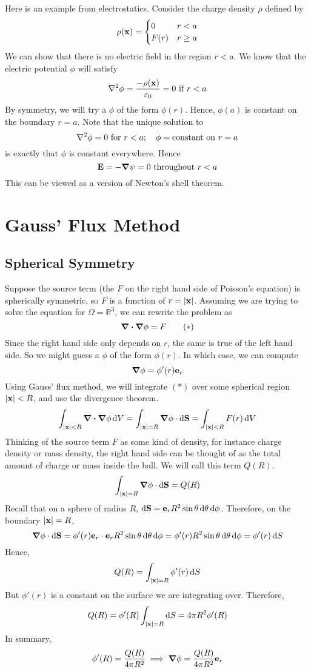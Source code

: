 \documentclass{article}
\begin{document}
\noindent Here is an example from electrostatics. Consider the charge density $\rho$ defined by
\[ \rho(\vb x) = \begin{cases}
        0    & r < a    \\
        F(r) & r \geq a
    \end{cases} \]
We can show that there is no electric field in the region $r < a$. We know that the electric potential $\phi$ will satisfy
\[ \laplacian{\phi} = \frac{-\rho(\vb x)}{\varepsilon_0} = 0 \text{ if } r<a \]
By symmetry, we will try a $\phi$ of the form $\phi(r)$. Hence, $\phi(a)$ is constant on the boundary $r=a$. Note that the unique solution to
\[ \laplacian{\phi} = 0 \text{ for } r<a;\quad \phi = \text{constant on } r = a \]
is exactly that $\phi$ is constant everywhere. Hence
\[ \vb E = -\grad{\psi} = 0 \text{ throughout } r<a \]
This can be viewed as a version of Newton's shell theorem.

\section{Gauss' Flux Method}
\subsection{Spherical Symmetry}
Suppose the source term (the $F$ on the right hand side of Poisson's equation) is spherically symmetric, so $F$ is a function of $r = \abs{\vb x}$. Assuming we are trying to solve the equation for $\Omega = \mathbb R^3$, we can rewrite the problem as
\begin{equation}
    \div{\grad{\phi}} = F
    \tag{$\ast$}
\end{equation}
Since the right hand side only depends on $r$, the same is true of the left hand side. So we might guess a $\phi$ of the form $\phi(r)$. In which case, we can compute
\[ \grad{\phi} = \phi'(r) \vb e_r \]
Using Gauss' flux method, we will integrate $(\ast)$ over some spherical region $\abs{\vb x} < R$, and use the divergence theorem.
\[ \int_{\abs{\vb x} < R} \div{\grad{\phi}}\dd{V} = \int_{\abs{\vb x} = R} \grad{\phi} \cdot \dd{\vb S} = \int_{\abs{\vb x} < R} F(r) \dd{V} \]
Thinking of the source term $F$ as some kind of density, for instance charge density or mass density, the right hand side can be thought of as the total amount of charge or mass inside the ball. We will call this term $Q(R)$.
\[ \int_{\abs{\vb x} = R} \grad{\phi} \cdot \dd{\vb S} = Q(R) \]
Recall that on a sphere of radius $R$, $\dd{\vb S} = \vb e_r R^2 \sin\theta \dd{\theta}\dd{\phi}$. Therefore, on the boundary $\abs{\vb x} = R$,
\[ \grad{\phi} \cdot \dd{\vb S} = \phi'(r) \vb e_r \cdot \vb e_r R^2 \sin\theta \dd{\theta}\dd{\phi} = \phi'(r) R^2 \sin\theta \dd{\theta}\dd{\phi} = \phi'(r) \dd{S} \]
Hence,
\[ Q(R) = \int_{\abs{\vb x} = R} \phi'(r) \dd{S} \]
But $\phi'(r)$ is a constant on the surface we are integrating over. Therefore,
\[ Q(R) = \phi'(R) \int_{\abs{\vb x} = R} \dd{S} = 4\pi R^2 \phi'(R) \]
In summary,
\[ \phi'(R) = \frac{Q(R)}{4\pi R^2} \implies \grad{\phi} = \frac{Q(R)}{4\pi R^2} \vb e_r \]
\end{document}
